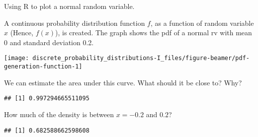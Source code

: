 \documentclass[ignorenonframetext,aspectratio=169]{beamer}
\begin{document}
\begin{frame}{Using R to plot a normal random variable.}
\protect\hypertarget{using-r-to-plot-a-normal-random-variable.}{}

A continuous probability distribution function \(f\), as a function of
random variable \(x\) (Hence, \(f(x)\)), is created. The graph shows the
pdf of a normal rv with mean 0 and standard deviation 0.2.

\begin{center}\texttt{[image: discrete\_probability\_distributions-I\_files/figure-beamer/pdf-generation-function-1]} \end{center}

\end{frame}

\begin{frame}[fragile]{}
\protect\hypertarget{section-2}{}

We can estimate the area under this curve. What should it be close to?
Why?

\begin{verbatim}
## [1] 0.997294665511095
\end{verbatim}

How much of the density is between \(x=-0.2\) and \(0.2\)?

\begin{verbatim}
## [1] 0.682588662598608
\end{verbatim}

\end{frame}

\end{document}
